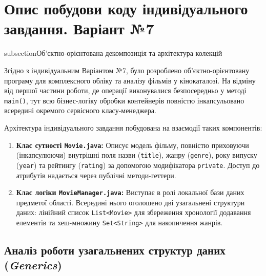 \section{Опис побудови коду індивідуального завдання. Варіант №7}

subsection{Об'єктно-орієнтована декомпозиція та архітектура колекцій}

Згідно з індивідуальним Варіантом №7, було розроблено об'єктно-орієнтовану програму 
для комплексного обліку та аналізу фільмів у кінокаталозі. На відміну від першої 
частини роботи, де операції виконувалися безпосередньо у методі \texttt{main()}, 
тут всю бізнес-логіку обробки контейнерів повністю інкапсульовано всередині окремого 
сервісного класу-менеджера.

Архітектура індивідуального завдання побудована на взаємодії таких компонентів:
\begin{enumerate}
    \item \textbf{Клас сутності \texttt{Movie.java}:} 
    Описує модель фільму, повністю приховуючи (інкапсулюючи) внутрішні поля назви 
    (\texttt{title}), жанру (\texttt{genre}), року випуску (\texttt{year}) та 
    рейтингу (\texttt{rating}) за допомогою модифікатора \texttt{private}. Доступ 
    до атрибутів надається через публічні методи-геттери.

    \item \textbf{Клас логіки \texttt{MovieManager.java}:} 
    Виступає в ролі локальної бази даних предметої області. Всередині нього 
    оголошено дві узагальнені структури даних: лінійний список \texttt{List<Movie>} 
    для збереження хронології додавання елементів та хеш-множину \texttt{Set<String>} 
    для накопичення жанрів.
\end{enumerate}

\subsection{Аналіз роботи узагальнених структур даних (\textit{Generics})}

